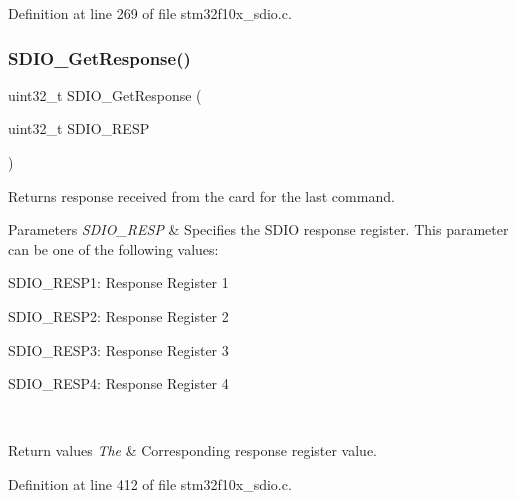 Definition at line 269 of file stm32f10x\+\_\+sdio.\+c.

\mbox{\label{group___s_d_i_o___exported___functions_ga5c1e859511840e8cca6a9a768bce220b}} 
\subsubsection{\texorpdfstring{S\+D\+I\+O\+\_\+\+Get\+Response()}{SDIO\_GetResponse()}}
{\footnotesize\ttfamily uint32\+\_\+t S\+D\+I\+O\+\_\+\+Get\+Response (\begin{DoxyParamCaption}\item[{uint32\+\_\+t}]{S\+D\+I\+O\+\_\+\+R\+E\+SP }\end{DoxyParamCaption})}



Returns response received from the card for the last command. 


\begin{DoxyParams}{Parameters}
{\em S\+D\+I\+O\+\_\+\+R\+E\+SP} & Specifies the S\+D\+IO response register. This parameter can be one of the following values\+: \begin{DoxyItemize}
\item S\+D\+I\+O\+\_\+\+R\+E\+S\+P1\+: Response Register 1 \item S\+D\+I\+O\+\_\+\+R\+E\+S\+P2\+: Response Register 2 \item S\+D\+I\+O\+\_\+\+R\+E\+S\+P3\+: Response Register 3 \item S\+D\+I\+O\+\_\+\+R\+E\+S\+P4\+: Response Register 4 \end{DoxyItemize}
\\
\hline
\end{DoxyParams}

\begin{DoxyRetVals}{Return values}
{\em The} & Corresponding response register value. \\
\hline
\end{DoxyRetVals}


Definition at line 412 of file stm32f10x\+\_\+sdio.\+c.

\mbox{\label{group___s_d_i_o___exported___functions_gad40764a8e37c0ed5c9141ae338ff0203}} 
